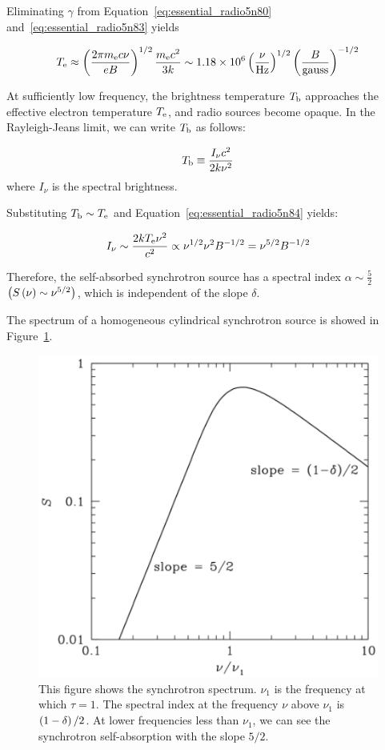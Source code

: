 Eliminating $\gamma$ from Equation~\ref{eq:essential_radio5n80} and~\ref{eq:essential_radio5n83} yields

\begin{equation}\label{eq:essential_radio5n84}
    T_{\mathrm{e}} \approx \left(\frac{2 \pi m_{\mathrm{e}} c \nu}{e B}\right)^{1 / 2} \frac{m_{\mathrm{e}} c^2}{3 k} \sim 1.18 \times 10^6\left(\frac{\nu}{\mathrm{Hz}}\right)^{1/2}\left(\frac{B}{\mathrm{gauss}}\right)^{-1/2}
\end{equation}

At sufficiently low frequency, the brightness temperature $T_{\mathrm{b}}$ approaches the effective electron temperature $T_{\mathrm{e}}$, and radio sources become opaque.
In the Rayleigh-Jeans limit, we can write $T_{\mathrm{b}}$ as follows:

\begin{equation}\label{eq:essential_radio5n87}
    T_{\mathrm{b}} \equiv \frac{I_{\nu}c^2}{2k\nu^2}
\end{equation}
where $I_{\nu}$ is the spectral brightness.

Substituting $T_{\mathrm{b}} \sim T_{\mathrm{e}}$ and Equation~\ref{eq:essential_radio5n84} yields:

\begin{equation}\label{eq:essential_radio5n88}
    I_{\nu} \sim \frac{2kT_{\mathrm{e}}\nu^2}{c^2} \propto \nu^{1/2}\nu^2 B^{-1/2} = \nu^{5/2} B^{-1/2}
\end{equation}

Therefore, the self-absorbed synchrotron source has a spectral index $\alpha\sim\frac{5}{2}$ $\left(S\left(\nu\right) \sim \nu^{5/2}\right)$, which is independent of the slope $\delta$.

The spectrum of a homogeneous cylindrical synchrotron source is showed in Figure~\ref{fig:nrao_radio5n7}.

\begin{figure}[htbp]
	\centering
	\includegraphics[width=.6\linewidth]{Chapter_2/Figures/NRAO_radio5n7.png}
    \caption[The spectrum of synchrotron radiation]{\label{fig:nrao_radio5n7}
        This figure shows the synchrotron spectrum.
        $\nu_1$ is the frequency at which $\tau=1$.
        The spectral index at the frequency $\nu$ above $\nu_1$ is $\left(1-\delta\right)/2$.
        At lower frequencies less than $\nu_1$, we can see the synchrotron self-absorption with the slope $5/2$.
    }
\end{figure}

